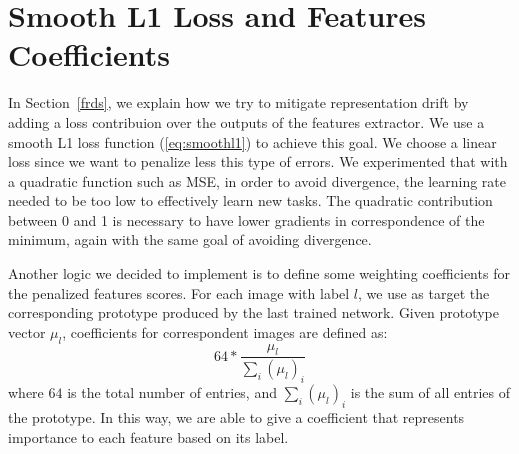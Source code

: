 \documentclass[10pt,twocolumn,letterpaper]{article}
\begin{document}
\appendix
\section{Smooth L1 Loss and Features Coefficients}
\label{appendix}
In Section~\ref{frds}, we explain how we try to mitigate representation drift by adding a loss contribuion over the outputs of the features extractor. We use a smooth L1 loss function (\ref{eq:smoothl1}) to achieve this goal. We choose a linear loss since we want to penalize less this type of errors. We experimented that with a quadratic function such as MSE, in order to avoid divergence, the learning rate needed to be too low to effectively learn new tasks. The quadratic contribution between 0 and 1 is necessary to have lower gradients in  correspondence of the minimum, again with the same goal of avoiding divergence.

Another logic we decided to implement is to define some weighting coefficients for the penalized features scores. For each image with label $l$, we use as target the corresponding prototype produced by the last trained network. Given prototype vector  $\mu_{l}$, coefficients for correspondent images are defined as:
\begin{equation}
    64 * \frac{\mu_{l}}{\sum_{i} (\mu_{l})_{i}}
\end{equation}
where $64$ is the total number of entries, and $\sum_{i} (\mu_{l})_{i}$ is the sum of all entries of the prototype. In this way, we are able to give a coefficient that represents importance to each feature based on its label.

{\small


}
\end{document}
